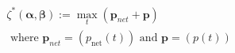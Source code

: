 \begin{equation}
\begin{split}
	\zeta^*(\boldsymbol{\alpha}, \boldsymbol{\beta}) := \max_t(\textbf{p}_{net} + \textbf{p})\\
	\text{ where } \textbf{p}_{net} = (p_\text{net}(t)) \text{ and } \textbf{p} = (p(t))
\end{split}
\label{ch2:equ:dynamic-cost}
\end{equation}